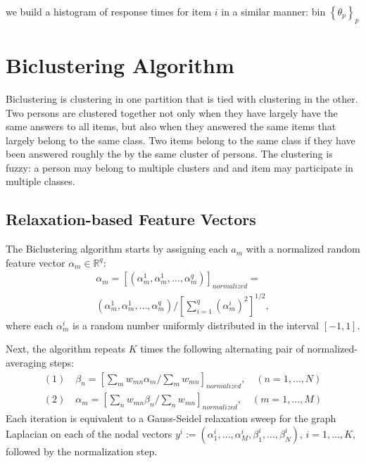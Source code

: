 \documentclass{article}
\newcommand{\R}{\mathbb{R}}
\begin{document}
we build a histogram of response times for item $i$ in a similar manner: bin $\left\{\theta_p\right\}_p$


\section{Biclustering Algorithm}
\label{biclustering}
Biclustering is clustering in one partition that is tied with clustering in the other. Two persons are clustered together not only when they have largely have the same answers to all items, but also when they answered the same items that largely belong to the same class. Two items belong to the same class if they have been answered roughly the by the same cluster of persons. The clustering is fuzzy: a person may belong to multiple clusters and and item may participate in multiple classes. 

\subsection{Relaxation-based Feature Vectors}
The Biclustering algorithm starts by assigning each $a_m$ with a normalized random feature vector $\alpha_m \in \R^q$:
\begin{equation}
\begin{split}
  \alpha_m = \left[ (\alpha_m^1,\alpha_m^1,\ldots,\alpha_m^q) \right]_{normalized} =  \\
  (\alpha_m^1,\alpha_m^1,\ldots,\alpha_m^q) /
  \left[ \sum_{i=1}^q (\alpha_m^i)^2 \right]^{1/2},
\end{split}
\end{equation}
where each $\alpha_m^i$ is a random number uniformly distributed in the interval $[-1,1]$. 

Next, the algorithm repeats $K$ times the following alternating pair of normalized-averaging steps:
\begin{equation}
\begin{split}
(1) \quad \beta_n = \left[ \sum_m w_{mn} \alpha_m / \sum_m w_{mn} \right]_{normalized}, \quad (n=1,\ldots,N) \\
(2) \quad \alpha_m = \left[ \sum_n w_{mn} \beta_n / \sum_n w_{mn} \right]_{normalized}, \quad (m=1,\ldots,M) 
\end{split}
\label{eqn:bistep}
\end{equation}
Each iteration is equivalent to a Gauss-Seidel relaxation sweep for the graph Laplacian \cite{lamg} on each of the nodal vectors $y^i := (\alpha_1^i,\dots,\alpha_M^i,\beta_1^i,\dots,\beta_N^i)$, $i=1,\dots,K$, followed by the normalization step.
\end{document}
